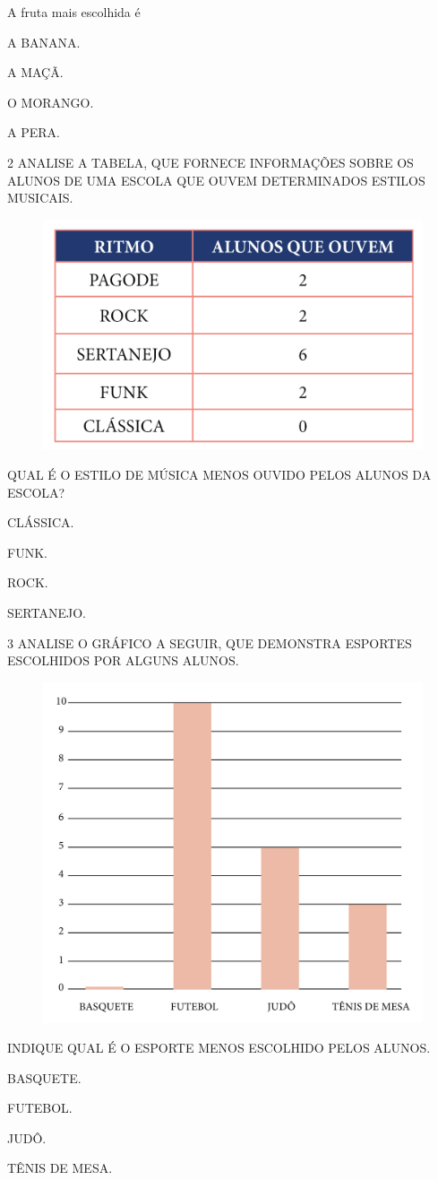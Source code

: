 A fruta mais escolhida é

\begin{escolha}
\item A BANANA.

\item A MAÇÃ.

\item O MORANGO.

\item A PERA.
\end{escolha}

\num{2} ANALISE A TABELA, QUE FORNECE INFORMAÇÕES SOBRE OS ALUNOS DE UMA ESCOLA QUE OUVEM DETERMINADOS ESTILOS MUSICAIS.

\begin{figure}[htpb!]
\centering
\includegraphics[width=.5\textwidth]{./media/SAEB_1ANO_MAT_FIGURA110.png}
\end{figure}

\pagebreak
QUAL É O ESTILO DE MÚSICA MENOS OUVIDO PELOS ALUNOS DA ESCOLA?

\begin{escolha}
\item CLÁSSICA.

\item FUNK.

\item ROCK.

\item SERTANEJO.
\end{escolha}

\num{3} ANALISE O GRÁFICO A SEGUIR, QUE DEMONSTRA ESPORTES ESCOLHIDOS POR ALGUNS ALUNOS.

\begin{figure}[htpb!]
\centering
\includegraphics[width=.6\textwidth]{./media/SAEB_1ANO_MAT_FIGURA111.png}
\end{figure}

INDIQUE QUAL É O ESPORTE MENOS ESCOLHIDO PELOS ALUNOS.

\begin{escolha}
\item BASQUETE.

\item FUTEBOL.

\item JUDÔ.

\item TÊNIS DE MESA.
\end{escolha}

\pagebreak
